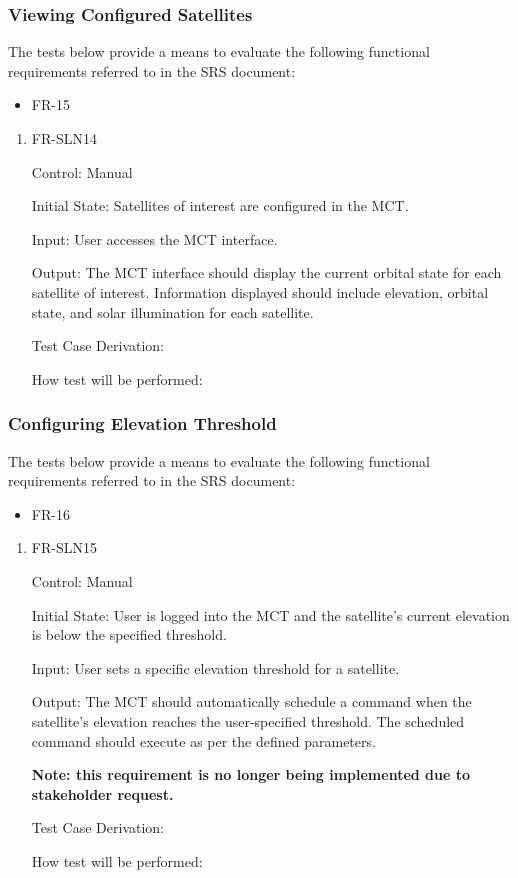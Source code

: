 \documentclass[12pt, titlepage]{article}
\begin{document}
\subsubsection{Viewing Configured Satellites}

The tests below provide a means to evaluate the following functional requirements referred to in the SRS document:
\begin{itemize}
    \item FR-15
\end{itemize}

\begin{enumerate}

\item{FR-SLN14\\}

Control: Manual
					
Initial State: Satellites of interest are configured in the MCT.
	
Input: User accesses the MCT interface.
					
Output: The MCT interface should display the current orbital state for each satellite of interest. Information displayed should include elevation, orbital state, and solar illumination for each satellite.

Test Case Derivation:
					
How test will be performed:

\end{enumerate}


\subsubsection{Configuring Elevation Threshold}

The tests below provide a means to evaluate the following functional requirements referred to in the SRS document:
\begin{itemize}
    \item FR-16
\end{itemize}

\begin{enumerate}

\item{FR-SLN15\\}

Control: Manual
					
Initial State: User is logged into the MCT and the satellite's current elevation is below the specified threshold.
	
Input: User sets a specific elevation threshold for a satellite.
					
Output: The MCT should automatically schedule a command when the satellite's elevation reaches the user-specified threshold. The scheduled command should execute as per the defined parameters.

\textbf{Note: this requirement is no longer being implemented due to stakeholder request.}

Test Case Derivation:
					
How test will be performed:

\end{enumerate}
\end{document}
